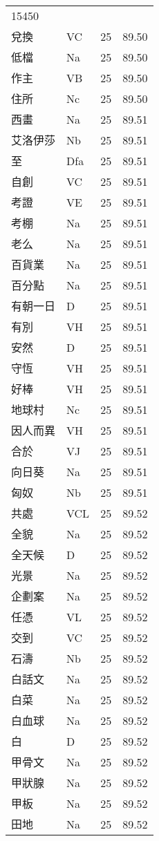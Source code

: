 \documentclass[twocolumn]{book}
\begin{document}
\begin{supertabular}{llrr}
15450\\
兌換 & VC & 25 &  89.50\\
低檔 & Na & 25 &  89.50\\
作主 & VB & 25 &  89.50\\
住所 & Nc & 25 &  89.50\\
西畫 & Na & 25 &  89.51\\
艾洛伊莎 & Nb & 25 &  89.51\\
至 & Dfa & 25 &  89.51\\
自創 & VC & 25 &  89.51\\
考證 & VE & 25 &  89.51\\
考棚 & Na & 25 &  89.51\\
老么 & Na & 25 &  89.51\\
百貨業 & Na & 25 &  89.51\\
百分點 & Na & 25 &  89.51\\
有朝一日 & D & 25 &  89.51\\
有別 & VH & 25 &  89.51\\
安然 & D & 25 &  89.51\\
守恆 & VH & 25 &  89.51\\
好棒 & VH & 25 &  89.51\\
地球村 & Nc & 25 &  89.51\\
因人而異 & VH & 25 &  89.51\\
合於 & VJ & 25 &  89.51\\
向日葵 & Na & 25 &  89.51\\
匈奴 & Nb & 25 &  89.51\\
共處 & VCL & 25 &  89.52\\
全貌 & Na & 25 &  89.52\\
全天候 & D & 25 &  89.52\\
光景 & Na & 25 &  89.52\\
企劃案 & Na & 25 &  89.52\\
任憑 & VL & 25 &  89.52\\
交到 & VC & 25 &  89.52\\
石濤 & Nb & 25 &  89.52\\
白話文 & Na & 25 &  89.52\\
白菜 & Na & 25 &  89.52\\
白血球 & Na & 25 &  89.52\\
白 & D & 25 &  89.52\\
甲骨文 & Na & 25 &  89.52\\
甲狀腺 & Na & 25 &  89.52\\
甲板 & Na & 25 &  89.52\\
田地 & Na & 25 &  89.52\\

\end{supertabular}
\end{document}
